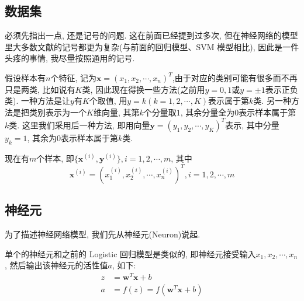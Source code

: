 \documentclass[a4paper,UTF8]{ctexart}
\theoremstyle{plain} \newtheorem{theorem}{定理}[section]
\theoremstyle{plain} \newtheorem{definition}{定义}[section]
\theoremstyle{plain} \newtheorem{lemma}{引理}[section]
\theoremstyle{plain} \newtheorem{proposition}{命题}[section]
\theoremstyle{plain} \newtheorem{example}{例}[section]
\theoremstyle{plain} \newtheorem{remark}{注}[section]
\theoremstyle{plain} \newtheorem{corollary}{推论}[section]
\begin{document}
\subsection{数据集}
必须先指出一点, 还是记号的问题. 这在前面已经提到过多次, 但在神经网络的模型里大多数文献的记号都更为复杂(与前面的回归模型、SVM 模型相比), 因此是一件头疼的事情, 我尽量按照通用的记号.

假设样本有$n$个特征, 记为$\bm{x} = (x_{1},x_{2},\cdots,x_{n})^{T}$,由于对应的类别可能有很多而不再只是两类, 比如说有$K$类, 因此现在得换一些方法(之前用$y = 0, 1$或$y = \pm 1$表示正负类). 一种方法是让$y$有$K$个取值, 用$y = k(k = 1, 2, \cdots, K)$表示属于第$k$类. 另一种方法是把类别表示为一个$K$维向量, 其第$k$个分量取$1$, 其余分量全为$0$表示样本属于第$k$类. 这里我们采用后一种方法, 即用向量$\bm{y} = (y_{1}, y_{2}, \cdots, y_{K})^{T}$表示, 其中分量$y_{k} = 1$, 其余为$0$表示样本属于第$k$类.

现在有$m$个样本, 即$\{ \bm{x}^{(i)}, \bm{y}^{(i)} \}, i = 1, 2, \cdots, m$, 其中
\begin{equation*}
\bm{x}^{(i)} = (x_{1}^{(i)}, x_{2}^{(i)}, \cdots, x_{n}^{(i)})^{T},i = 1, 2, \cdots, m
\end{equation*}


\subsection{神经元}
为了描述神经网络模型, 我们先从神经元(Neuron)说起.

单个的神经元和之前的 Logistic 回归模型是类似的, 即神经元接受输入$x_{1}, x_{2}, \cdots, x_{n}$, 然后输出该神经元的活性值$a$, 如下:
\begin{align*}
z & = \bm{w}^{T} \bm{x} + b \\ 
a & = f(z) = f(\bm{w}^{T} \bm{x} + b)
\end{align*}
\end{document}
